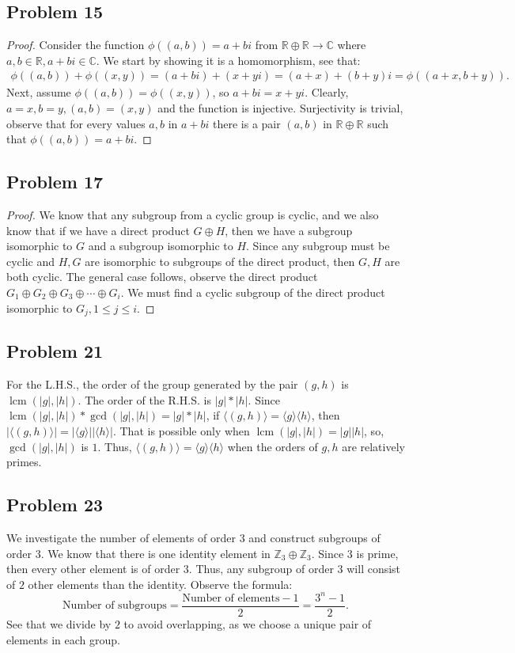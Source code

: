 \documentclass[a4paper,12pt]{article}
\begin{document}
\subsection*{Problem 15}
\begin{proof}
    Consider the function $\phi((a,b))=a+bi$ from $\mathbb{R}\oplus \mathbb{R} \to \mathbb{C}$ where $a,b \in \mathbb{R}, a+bi \in \mathbb{C}.$ We start by showing it is a homomorphism, see that:
    \begin{align*}
        \phi((a,b))+\phi((x,y))=(a+bi)+(x+yi)=(a+x)+(b+y)i=\phi((a+x, b+y)).
    \end{align*}
    Next, assume $\phi((a,b))=\phi((x,y))$, so $a+bi=x+yi$. Clearly, $a=x, b=y, (a,b)=(x,y)$ and the function is injective.
    Surjectivity is trivial, observe that for every values $a,b$ in $a+bi$ there is a pair $(a,b)$ in $\mathbb{R} \oplus \mathbb{R}$ such that $\phi((a,b))=a+bi.$
\end{proof}
\subsection*{Problem 17}
\begin{proof}
    We know that any subgroup from a cyclic group is cyclic, and we also know that if we have a direct product $G\oplus H$, then we have a subgroup isomorphic to $G$ and a subgroup isomorphic to $H$. Since any subgroup must be cyclic and $H,G$ are isomorphic to subgroups of the direct product, then $G,H$ are both cyclic. The general case follows, observe the direct product $G_1\oplus G_2\oplus G_3\oplus \cdots \oplus G_i$. We must find a cyclic subgroup of the direct product isomorphic to $G_j, 1\le j \le i.$    
\end{proof}
\subsection*{Problem 21}
For the L.H.S., the order of the group generated by the pair $(g,h)$ is $\operatorname{lcm}(|g|, |h|).$ The order of the R.H.S. is $|g|*|h|.$ Since $\operatorname{lcm}(|g|,|h|)*\gcd(|g|, |h|)=|g|*|h|$, if $\langle (g,h) \rangle = \langle g \rangle \langle h \rangle$, then $|\langle (g,h) \rangle|=|\langle g \rangle||\langle h \rangle|$. That is possible only when $\operatorname{lcm}(|g|,|h|)=|g||h|$, so, $\gcd(|g|, |h|)$ is $1$. Thus, $\langle (g,h) \rangle=\langle g \rangle \langle h \rangle$ when the orders of $g,h$ are relatively primes.
\subsection*{Problem 23}
We investigate the number of elements of order $3$ and construct subgroups of order $3$. We know that there is one identity element in $\mathbb{Z}_3 \oplus \mathbb{Z}_3.$ Since $3$ is prime, then every other element is of order $3$. Thus, any subgroup of order $3$ will consist of $2$ other elements than the identity. Observe the formula:
\[\text{Number of subgroups}= \frac{\text{Number of elements}-1}{2} = \frac{3^n-1}{2}.\]
See that we divide by $2$ to avoid overlapping, as we choose a unique pair of elements in each group.
\end{document}
